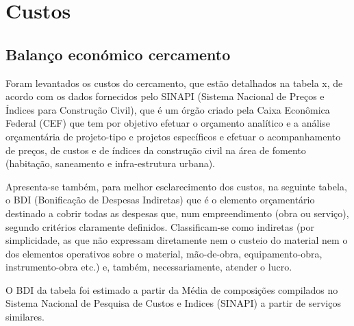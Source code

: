\chapter{Custos}

\section{Balanço económico cercamento}

 Foram levantados os custos do cercamento, que estão detalhados na tabela x, de acordo com os dados fornecidos pelo SINAPI (Sistema Nacional de Preços e Índices para Construção Civil), que é um órgão criado pela Caixa Econômica Federal (CEF) que tem por objetivo efetuar o orçamento analítico e a análise orçamentária de projeto-tipo e projetos específicos e efetuar o acompanhamento de preços, de custos e de índices da construção civil na área de fomento (habitação, saneamento e infra-estrutura urbana). 
 
Apresenta-se também, para melhor esclarecimento dos custos, na seguinte tabela, o BDI (Bonificação de Despesas Indiretas) que é o elemento orçamentário destinado a cobrir todas as despesas que, num empreendimento (obra ou serviço), segundo critérios claramente definidos. Classificam-se como indiretas (por simplicidade, as que não expressam diretamente nem o custeio do material nem o dos elementos operativos sobre o material, mão-de-obra, equipamento-obra, instrumento-obra etc.) e, também, necessariamente, atender o lucro.

O BDI da tabela foi estimado a partir da Média de composições compilados no Sistema Nacional de Pesquisa de Custos e Indices (SINAPI) a partir de serviços similares.



